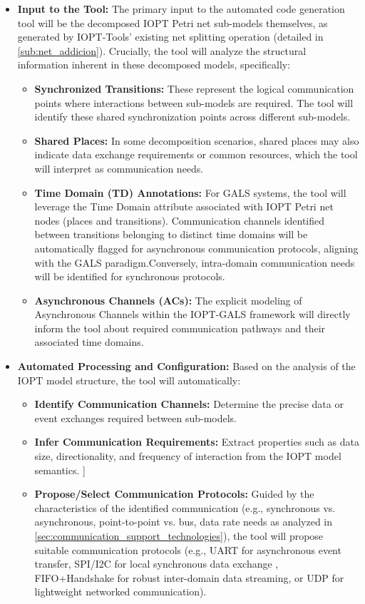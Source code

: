 \begin{itemize}
    \item \textbf{Input to the Tool:} The primary input to the automated code generation tool will be the decomposed IOPT Petri net sub-models themselves, as generated by IOPT-Tools' existing net splitting operation (detailed in \ref{sub:net_addicion}). Crucially, the tool will analyze the structural information inherent in these decomposed models, specifically:
    \begin{itemize}
       \item \textbf{Synchronized Transitions:} These represent the logical communication points where interactions between sub-models are required. The tool will identify these shared synchronization points across different sub-models.
        \item \textbf{Shared Places:} In some decomposition scenarios, shared places may also indicate data exchange requirements or common resources, which the tool will interpret as communication needs.
       \item \textbf{Time Domain (TD) Annotations:} For GALS systems, the tool will leverage the Time Domain attribute associated with IOPT Petri net nodes (places and transitions). Communication channels identified between transitions belonging to distinct time domains will be automatically flagged for asynchronous communication protocols, aligning with the GALS paradigm.Conversely, intra-domain communication needs will be identified for synchronous protocols.
        \item \textbf{Asynchronous Channels (ACs):} The explicit modeling of Asynchronous Channels within the IOPT-GALS framework will directly inform the tool about required communication pathways and their associated time domains.
    \end{itemize}

    \item \textbf{Automated Processing and Configuration:} Based on the analysis of the IOPT model structure, the tool will automatically:
    \begin{itemize}
        \item \textbf{Identify Communication Channels:} Determine the precise data or event exchanges required between sub-models.
        \item \textbf{Infer Communication Requirements:} Extract properties such as data size, directionality, and frequency of interaction from the IOPT model semantics.
        ]\item \textbf{Propose/Select Communication Protocols:} Guided by the characteristics of the identified communication (e.g., synchronous vs. asynchronous, point-to-point vs. bus, data rate needs as analyzed in \ref{sec:communication_support_technologies}), the tool will propose suitable communication protocols (e.g., UART for asynchronous event transfer, SPI/I2C for local synchronous data exchange , FIFO+Handshake for robust inter-domain data streaming, or UDP for lightweight networked communication).
    \end{itemize}


\end{itemize}
